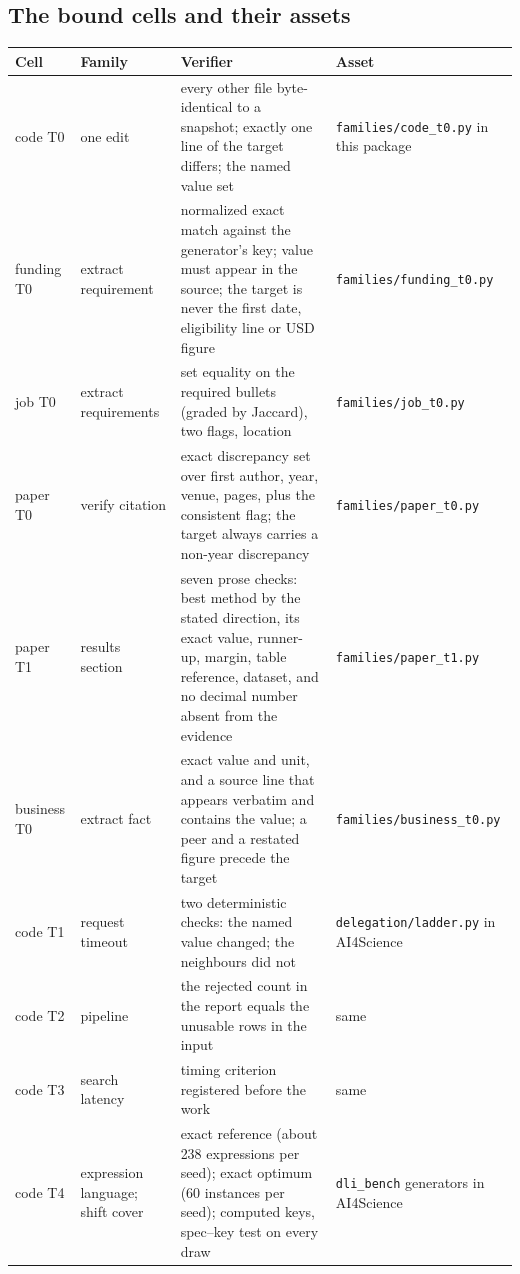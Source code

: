 \subsection{The bound cells and their assets}

\begin{table}[H]
\centering\footnotesize
\begin{tabularx}{\textwidth}{@{}p{2.2cm}p{3.4cm}YY@{}}
\toprule
Cell & Family & Verifier & Asset \\
\midrule
code T0 & one edit & every other file byte-identical to a snapshot; exactly one line of the target differs; the named value set & \texttt{families/code\_t0.py} in this package \\
funding T0 & extract requirement & normalized exact match against the generator's key; value must appear in the source; the target is never the first date, eligibility line or USD figure & \texttt{families/funding\_t0.py} \\
job T0 & extract requirements & set equality on the required bullets (graded by Jaccard), two flags, location & \texttt{families/job\_t0.py} \\
paper T0 & verify citation & exact discrepancy set over first author, year, venue, pages, plus the consistent flag; the target always carries a non-year discrepancy & \texttt{families/paper\_t0.py} \\
paper T1 & results section & seven prose checks: best method by the stated direction, its exact value, runner-up, margin, table reference, dataset, and no decimal number absent from the evidence & \texttt{families/paper\_t1.py} \\
business T0 & extract fact & exact value and unit, and a source line that appears verbatim and contains the value; a peer and a restated figure precede the target & \texttt{families/business\_t0.py} \\
code T1 & request timeout & two deterministic checks: the named value changed; the neighbours did not & \texttt{delegation/ladder.py} in AI4Science \\
code T2 & pipeline & the rejected count in the report equals the unusable rows in the input & same \\
code T3 & search latency & timing criterion registered before the work & same \\
code T4 & expression language; shift cover & exact reference (about 238 expressions per seed); exact optimum (60 instances per seed); computed keys, spec--key test on every draw & \texttt{dli\_bench} generators in AI4Science \\

\end{tabularx}
\end{table}
